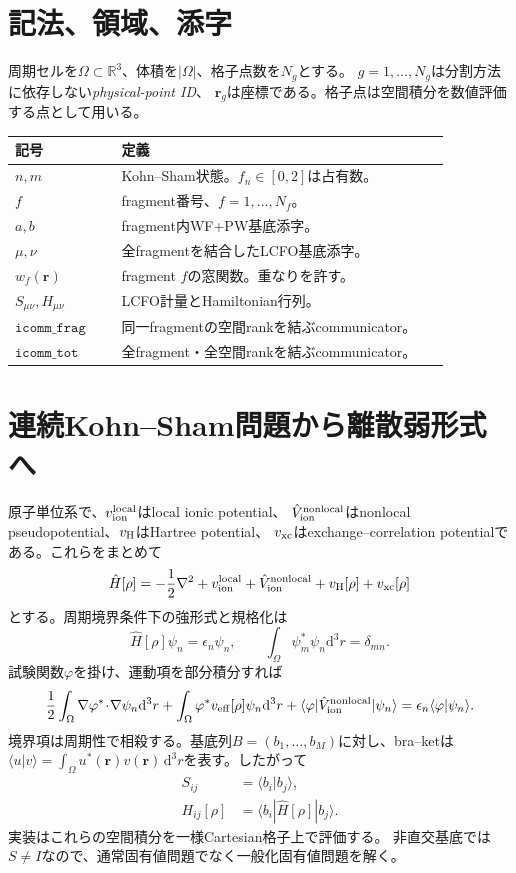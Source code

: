 \documentclass[11pt,a4paper]{article}
\newcommand{\dd}{\mathrm d}
\newcommand{\laplacian}{\nabla^2}
\begin{document}
\section{記法、領域、添字}
周期セルを$\Omega\subset\mathbb R^3$、体積を$|\Omega|$、格子点数を$N_g$とする。
$g=1,\ldots,N_g$は分割方法に依存しない\emph{physical-point ID}、
$\boldsymbol r_g$は座標である。格子点は空間積分を数値評価する点として用いる。
\begin{longtable}{@{}p{0.23\linewidth}p{0.71\linewidth}@{}}
\toprule 記号 & 定義 \\ \midrule
$n,m$ & Kohn--Sham状態。$f_n\in[0,2]$は占有数。\\
$f$ & fragment番号、$f=1,\ldots,N_f$。\\
$a,b$ & fragment内WF+PW基底添字。\\
$\mu,\nu$ & 全fragmentを結合したLCFO基底添字。\\
$w_f(\boldsymbol r)$ & fragment $f$の窓関数。重なりを許す。\\
$S_{\mu\nu},H_{\mu\nu}$ & LCFO計量とHamiltonian行列。\\
$\texttt{icomm\_frag}$ & 同一fragmentの空間rankを結ぶcommunicator。\\
$\texttt{icomm\_tot}$ & 全fragment・全空間rankを結ぶcommunicator。\\
\bottomrule
\end{longtable}

\section{連続Kohn--Sham問題から離散弱形式へ}
原子単位系で、$v_{\rm ion}^{\rm local}$はlocal ionic potential、
$\hat V_{\rm ion}^{\rm nonlocal}$はnonlocal pseudopotential、$v_{\rm H}$はHartree potential、
$v_{\rm xc}$はexchange--correlation potentialである。これらをまとめて
\begin{equation}
 \hat H[\rho]= -\frac12\laplacian+v_{\rm ion}^{\rm local}
 +\hat V_{\rm ion}^{\rm nonlocal}+v_{\rm H}[\rho]+v_{\rm xc}[\rho]
 \label{eq:ham}
\end{equation}
とする。周期境界条件下の強形式と規格化は
\begin{equation}
 \hat H[\rho]\psi_n=\epsilon_n\psi_n,
 \qquad \int_\Omega\psi_m^*\psi_n\dd^3r=\delta_{mn}.
\end{equation}
試験関数$\varphi$を掛け、運動項を部分積分すれば
\begin{equation}
 \frac12\int_\Omega\nabla\varphi^*\!\cdot\!\nabla\psi_n\dd^3r
 +\int_\Omega\varphi^*v_{\rm eff}[\rho]\psi_n\dd^3r
 +\langle\varphi|\hat V_{\rm ion}^{\rm nonlocal}|\psi_n\rangle
 =\epsilon_n\langle\varphi|\psi_n\rangle .
\end{equation}
境界項は周期性で相殺する。基底列$B=(b_1,\ldots,b_M)$に対し、bra--ketは
$\langle u|v\rangle=\int_\Omega u^*(\boldsymbol r)v(\boldsymbol r)\,\dd^3r$を表す。したがって
\begin{align}
 S_{ij}&=\langle b_i|b_j\rangle,\\
 H_{ij}[\rho]&=\langle b_i|\hat H[\rho]|b_j\rangle.
 \label{eq:hs}
\end{align}
実装はこれらの空間積分を一様Cartesian格子上で評価する。
非直交基底では$S\ne I$なので、通常固有値問題でなく一般化固有値問題を解く。
\end{document}
